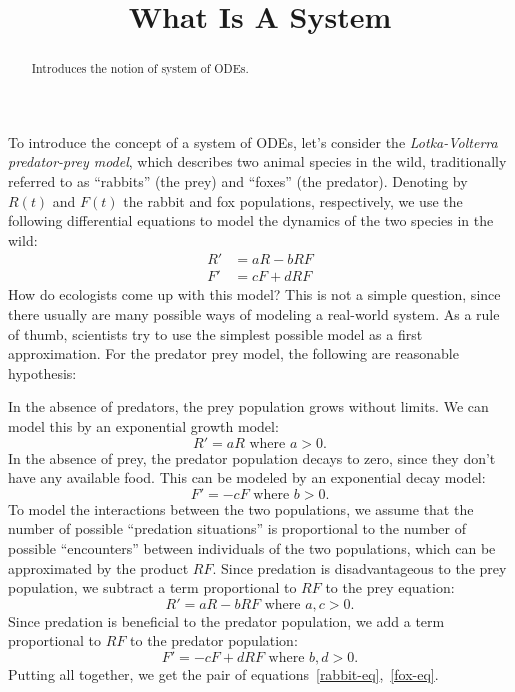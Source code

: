 \documentclass{ximera}
\title{What Is A System}
\begin{document}
\begin{abstract}
Introduces the notion of system of ODEs.
\end{abstract}
\maketitle

To introduce the concept of a system of ODEs, let's consider the \emph{Lotka-Volterra predator-prey model}, which describes two animal species in the wild, traditionally referred to as ``rabbits'' (the prey) and ``foxes'' (the predator). Denoting by $R(t)$ and $F(t)$ the rabbit and fox populations, respectively, we use the following differential equations to model the dynamics of the two species in the wild:
\begin{align}
\label{rabbit-eq}R'&=aR-bRF\\
\label{fox-eq}F'&=cF+dRF
\end{align}
How do ecologists come up with this model? This is not a simple question, since there usually are many possible ways of modeling a real-world system. As a rule of thumb, scientists try to use the simplest possible model as a first approximation. For the predator prey model, the following are reasonable hypothesis:

In the absence of predators, the prey population grows without limits. We can model this by an exponential growth model:
\[
R'=aR\text{ where $a>0$}.
\]
In the absence of prey, the predator population decays to zero, since they don't have any available food. This can be modeled by an exponential decay model:
\[
F'=-cF\text{ where $b>0$.}
\]
To model the interactions between the two populations, we assume that the number of possible ``predation situations'' is proportional to the number of possible ``encounters'' between individuals of the two populations, which can be approximated by the product $RF$.
Since predation is disadvantageous to the prey population, we subtract a term proportional to $RF$ to the prey equation:
\[
R'=aR-bRF\text{ where $a,c>0$}.
\]
Since predation is beneficial to the predator population, we add a term proportional to $RF$ to the predator population:
\[
F'=-cF+dRF\text{ where $b,d>0$.}
\]
Putting all together, we get the pair of equations~\ref{rabbit-eq},~\ref{fox-eq}.
\end{document}
